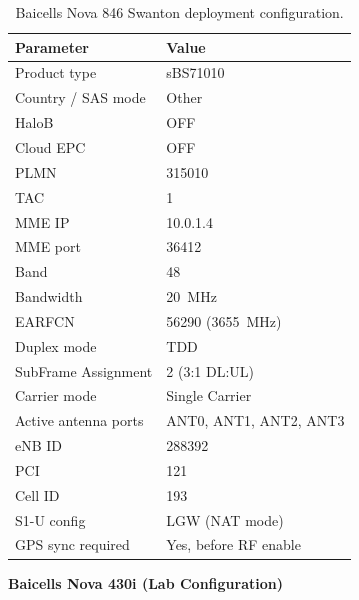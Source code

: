 \documentclass[
    left=1.5in,
    right=1.25in,
    top=1.25in,
    bottom=1.25in
]{CalPolySeniorProject}
\begin{document}
\begin{table}[!ht]
    \centering
    \caption[Nova 846 configuration reference]{Baicells Nova 846 Swanton
    deployment configuration.}
    \vspace{0.5\baselineskip}
    \begin{tabular}{ll}
        \toprule
        \textbf{Parameter} & \textbf{Value} \\
        \midrule
        Product type       & sBS71010 \\
        Country / SAS mode & Other \\
        HaloB              & OFF \\
        Cloud EPC          & OFF \\
        PLMN               & 315010 \\
        TAC                & 1 \\
        MME IP             & 10.0.1.4 \\
        MME port           & 36412 \\
        Band               & 48 \\
        Bandwidth          & 20~MHz \\
        EARFCN             & 56290 (3655~MHz) \\
        Duplex mode        & TDD \\
        SubFrame Assignment & 2 (3:1 DL:UL) \\
        Carrier mode       & Single Carrier \\
        Active antenna ports & ANT0, ANT1, ANT2, ANT3 \\
        eNB ID             & 288392 \\
        PCI                & 121 \\
        Cell ID            & 193 \\
        S1-U config        & LGW (NAT mode) \\
        GPS sync required  & Yes, before RF enable \\
        \bottomrule
    \end{tabular}
    \label{tab:nova846_config}
\end{table}

\textbf{Baicells Nova 430i (Lab Configuration)}
\end{document}
